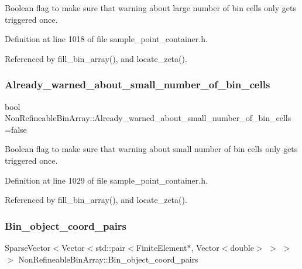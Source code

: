 Boolean flag to make sure that warning about large number of bin cells only gets triggered once. 



Definition at line 1018 of file sample\+\_\+point\+\_\+container.\+h.



Referenced by fill\+\_\+bin\+\_\+array(), and locate\+\_\+zeta().

\mbox{\label{classNonRefineableBinArray_a00af6975c82a55816e96d63f73a2ae6b}} 
\subsubsection{\texorpdfstring{Already\+\_\+warned\+\_\+about\+\_\+small\+\_\+number\+\_\+of\+\_\+bin\+\_\+cells}{Already\_warned\_about\_small\_number\_of\_bin\_cells}}
{\footnotesize\ttfamily bool Non\+Refineable\+Bin\+Array\+::\+Already\+\_\+warned\+\_\+about\+\_\+small\+\_\+number\+\_\+of\+\_\+bin\+\_\+cells =false\hspace{0.3cm}{\ttfamily [static]}}



Boolean flag to make sure that warning about small number of bin cells only gets triggered once. 



Definition at line 1029 of file sample\+\_\+point\+\_\+container.\+h.



Referenced by fill\+\_\+bin\+\_\+array(), and locate\+\_\+zeta().

\mbox{\label{classNonRefineableBinArray_aab1a7f3687936a21af92124a4ae7bd86}} 
\subsubsection{\texorpdfstring{Bin\+\_\+object\+\_\+coord\+\_\+pairs}{Bin\_object\_coord\_pairs}}
{\footnotesize\ttfamily Sparse\+Vector$<$Vector$<$std\+::pair$<$Finite\+Element$\ast$, Vector$<$double$>$ $>$ $>$ $>$ Non\+Refineable\+Bin\+Array\+::\+Bin\+\_\+object\+\_\+coord\+\_\+pairs\hspace{0.3cm}{\ttfamily [private]}}



